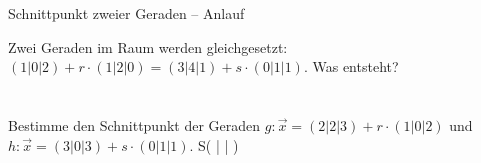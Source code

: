 \begin{aufgabe}{Schnittpunkt zweier Geraden – Anlauf}
\begin{teile}
\teil Zwei Geraden im Raum werden gleichgesetzt: $(1|0|2) + r \cdot (1|2|0) = (3|4|1) + s \cdot (0|1|1)$. Was entsteht? \\  \\  \\ 
\teil Bestimme den Schnittpunkt der Geraden $g: \vec{x} = (2|2|3) + r \cdot (1|0|2)$ und $h: \vec{x} = (3|0|3) + s \cdot (0|1|1)$. S( \leerfeld | \leerfeld | \leerfeld )
\end{teile}
\end{aufgabe}

